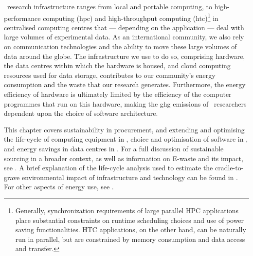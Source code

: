 \documentclass[../SustainableHEP.tex]{subfiles}
\begin{document}
\ACR\ research infrastructure ranges from local and portable computing, to high-performance computing (\acrshort{hpc}) and high-throughput computing (\acrshort{htc})\footnote{Generally, synchronization requirements of large parallel HPC applications place substantial constraints on runtime scheduling choices and use of power saving functionalities.  HTC applications, on the other hand, can be naturally run in parallel, but are constrained by memory consumption and data access and transfer.} in centralised computing centres that {---} depending on the application {---} deal with large volumes of experimental data. As an international community, we also rely on communication technologies and the ability to move these large volumes of data around the globe. The infrastructure we use to do so, comprising hardware, the data centres within which the hardware is housed, and cloud computing resources used for data storage, contributes to our community's energy consumption and the waste that our research generates.  Furthermore, the energy efficiency of hardware is ultimately limited by the efficiency of the computer programmes that run on this hardware, making the \acrshort{ghg} emissions of \ACR\ researchers dependent upon the choice of software architecture.

This chapter covers sustainability in procurement, and  extending and optimising the life-cycle of computing equipment in , choice and optimisation of software in , and energy savings in data centres in .  For a full discussion of sustainable sourcing in a broader context, as well as information on E-waste and its impact, see . A brief explanation of the life-cycle analysis used to estimate the cradle-to-grave environmental impact of infrastructure and technology can be found in .  For other aspects of energy use, see .
\end{document}
